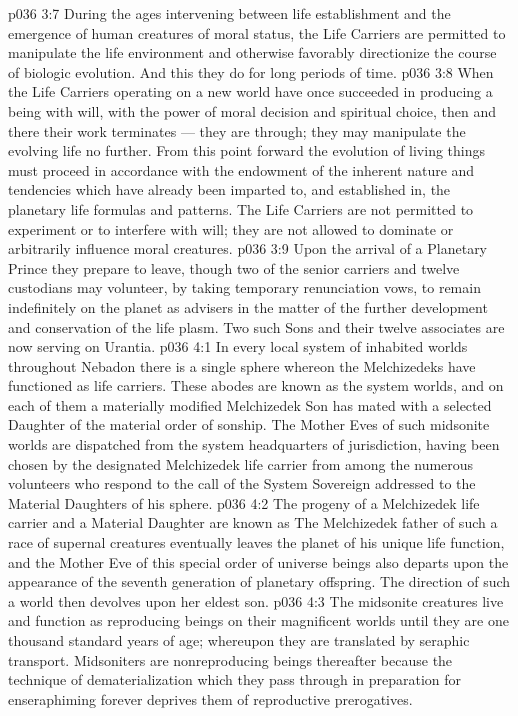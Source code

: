 \vs p036 3:7 During the ages intervening between life establishment and the emergence of human creatures of moral status, the Life Carriers are permitted to manipulate the life environment and otherwise favorably directionize the course of biologic evolution. And this they do for long periods of time.
\vs p036 3:8 When the Life Carriers operating on a new world have once succeeded in producing a being with will, with the power of moral decision and spiritual choice, then and there their work terminates --- they are through; they may manipulate the evolving life no further. From this point forward the evolution of living things must proceed in accordance with the endowment of the inherent nature and tendencies which have already been imparted to, and established in, the planetary life formulas and patterns. The Life Carriers are not permitted to experiment or to interfere with will; they are not allowed to dominate or arbitrarily influence moral creatures.
\vs p036 3:9 Upon the arrival of a Planetary Prince they prepare to leave, though two of the senior carriers and twelve custodians may volunteer, by taking temporary renunciation vows, to remain indefinitely on the planet as advisers in the matter of the further development and conservation of the life plasm. Two such Sons and their twelve associates are now serving on Urantia.
\vs p036 4:1 In every local system of inhabited worlds throughout Nebadon there is a single sphere whereon the Melchizedeks have functioned as life carriers. These abodes are known as the system  worlds, and on each of them a materially modified Melchizedek Son has mated with a selected Daughter of the material order of sonship. The Mother Eves of such midsonite worlds are dispatched from the system headquarters of jurisdiction, having been chosen by the designated Melchizedek life carrier from among the numerous volunteers who respond to the call of the System Sovereign addressed to the Material Daughters of his sphere.
\vs p036 4:2 The progeny of a Melchizedek life carrier and a Material Daughter are known as  The Melchizedek father of such a race of supernal creatures eventually leaves the planet of his unique life function, and the Mother Eve of this special order of universe beings also departs upon the appearance of the seventh generation of planetary offspring. The direction of such a world then devolves upon her eldest son.
\vs p036 4:3 The midsonite creatures live and function as reproducing beings on their magnificent worlds until they are one thousand standard years of age; whereupon they are translated by seraphic transport. Midsoniters are nonreproducing beings thereafter because the technique of dematerialization which they pass through in preparation for enseraphiming forever deprives them of reproductive prerogatives.
